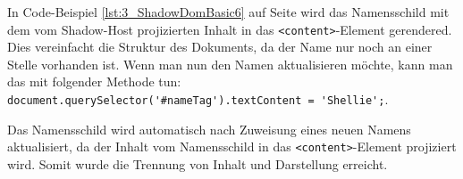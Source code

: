 \begin{enumerate}
In Code-Beispiel \ref{lst:3_ShadowDomBasic6} auf Seite \pageref{lst:3_ShadowDomBasic6} wird das Namensschild mit dem vom Shadow-Host projizierten Inhalt in das \lstinline|<content>|-Element gerendered.
Dies vereinfacht die Struktur des Dokuments, da der Name nur noch an einer Stelle vorhanden ist. Wenn man nun den Namen aktualisieren möchte, kann man das mit folgender Methode tun: \lstinline|document.querySelector('#nameTag').textContent = 'Shellie';|.

Das Namensschild wird automatisch nach Zuweisung eines neuen Namens aktualisiert, da der Inhalt vom Namensschild in das \lstinline|<content>|-Element projiziert wird. Somit wurde die Trennung von Inhalt und Darstellung erreicht.
\end{enumerate}